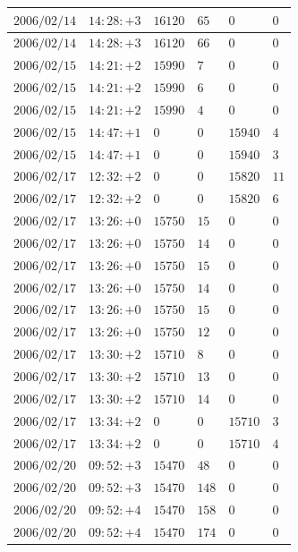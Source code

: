 \documentclass[a4j,papersize,disablejfam,slide,14pt]{jsarticle}
\begin{document}
\begin{description}
\begin{center}
\begin{longtable}{|l|l|l|l|l|l|}
					$2006/02/14$ & $14:28:+3$  & $16120$ & $65$ & $0$ & $0$ \\ \hline
					$2006/02/14$ & $14:28:+3$  & $16120$ & $66$ & $0$ & $0$ \\ \hline
					$2006/02/15$ & $14:21:+2$  & $15990$ & $7$ & $0$ & $0$ \\ \hline
					$2006/02/15$ & $14:21:+2$  & $15990$ & $6$ & $0$ & $0$ \\ \hline
					$2006/02/15$ & $14:21:+2$  & $15990$ & $4$ & $0$ & $0$ \\ \hline
					$2006/02/15$ & $14:47:+1$  & $0$ & $0$ & $15940$ & $4$ \\ \hline
					$2006/02/15$ & $14:47:+1$  & $0$ & $0$ & $15940$ & $3$ \\ \hline
					$2006/02/17$ & $12:32:+2$  & $0$ & $0$ & $15820$ & $11$ \\ \hline
					$2006/02/17$ & $12:32:+2$  & $0$ & $0$ & $15820$ & $6$ \\ \hline
					$2006/02/17$ & $13:26:+0$  & $15750$ & $15$ & $0$ & $0$ \\ \hline
					$2006/02/17$ & $13:26:+0$  & $15750$ & $14$ & $0$ & $0$ \\ \hline
					$2006/02/17$ & $13:26:+0$  & $15750$ & $15$ & $0$ & $0$ \\ \hline
					$2006/02/17$ & $13:26:+0$  & $15750$ & $14$ & $0$ & $0$ \\ \hline
					$2006/02/17$ & $13:26:+0$  & $15750$ & $15$ & $0$ & $0$ \\ \hline
					$2006/02/17$ & $13:26:+0$  & $15750$ & $12$ & $0$ & $0$ \\ \hline
					$2006/02/17$ & $13:30:+2$  & $15710$ & $8$ & $0$ & $0$ \\ \hline
					$2006/02/17$ & $13:30:+2$  & $15710$ & $13$ & $0$ & $0$ \\ \hline
					$2006/02/17$ & $13:30:+2$  & $15710$ & $14$ & $0$ & $0$ \\ \hline
					$2006/02/17$ & $13:34:+2$  & $0$ & $0$ & $15710$ & $3$ \\ \hline
					$2006/02/17$ & $13:34:+2$  & $0$ & $0$ & $15710$ & $4$ \\ \hline
					$2006/02/20$ & $09:52:+3$  & $15470$ & $48$ & $0$ & $0$ \\ \hline
					$2006/02/20$ & $09:52:+3$  & $15470$ & $148$ & $0$ & $0$ \\ \hline
					$2006/02/20$ & $09:52:+4$  & $15470$ & $158$ & $0$ & $0$ \\ \hline
					$2006/02/20$ & $09:52:+4$  & $15470$ & $174$ & $0$ & $0$ \\ \hline

\end{longtable}
\end{center}
\end{description}
\end{document}

